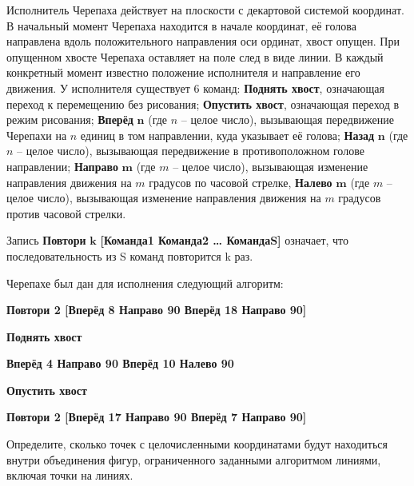\documentclass[14pt,a4paper]{article}
\begin{document}
Исполнитель Черепаха действует на плоскости с декартовой системой
координат. В начальный момент Черепаха находится в начале координат,
её голова направлена вдоль положительного направления оси ординат,
хвост опущен. При опущенном хвосте Черепаха оставляет на поле след в
виде линии. В каждый конкретный момент известно положение исполнителя
и направление его движения. У исполнителя существует 6 команд:
\textbf{Поднять хвост}, означающая переход к перемещению без
рисования; \textbf{Опустить хвост}, означающая переход в режим
рисования; \textbf{Вперёд} $\bm{n}$ (где $n$ – целое число),
вызывающая передвижение Черепахи на $n$ единиц в том направлении,
куда указывает её голова; \textbf{Назад} $\bm{n}$ (где $n$ – целое
число), вызывающая передвижение в противоположном голове направлении;
\textbf{Направо} $\bm{m}$ (где $m$ – целое число), вызывающая
изменение направления движения на $m$ градусов по часовой стрелке,
\textbf{Налево} $\bm{m}$ (где $m$ – целое число), вызывающая
изменение направления движения на $m$ градусов против часовой стрелки.

Запись \textbf{Повтори} $\bm{k}$ \textbf{[Команда1 Команда2 …
КомандаS]} означает, что последовательность из S команд повторится k
раз.

Черепахе был дан для исполнения следующий алгоритм:

\textbf{Повтори 2 [Вперёд 8 Направо 90 Вперёд 18 Направо 90]}

\textbf{Поднять хвост}

\textbf{Вперёд 4 Направо 90 Вперёд 10 Налево 90}

\textbf{Опустить хвост}

\textbf{Повтори 2 [Вперёд 17 Направо 90 Вперёд 7 Направо 90]}

Определите, сколько точек с целочисленными координатами будут
находиться внутри объединения фигур, ограниченного заданными
алгоритмом линиями, включая точки на линиях.
\end{document}
